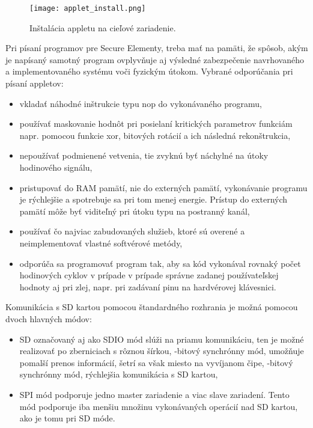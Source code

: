 \documentclass[12pt,a4paper,oneside,openright]{report}
\begin{document}
\begin{figure*}[h]
	\centering
	\texttt{[image: applet\_install.png]}
	\caption{Inštalácia appletu na cieľové zariadenie. \cite{javacardinstruction}}
	\label{f:applet_install}
\end{figure*}


Pri písaní programov pre Secure Elementy, treba mať na pamäti, že spôsob, akým je napísaný samotný program ovplyvňuje aj výsledné zabezpečenie navrhovaného a implementovaného systému voči fyzickým útokom.
Vybrané odporúčania pri písaní appletov:
\begin{itemize}
	\item vkladať náhodné inštrukcie typu nop do vykonávaného programu,
	\item používať maskovanie hodnôt pri posielaní kritických parametrov funkciám napr. pomocou funkcie xor, bitových rotácií a ich následná rekonštrukcia,
	\item nepoužívať podmienené vetvenia, tie zvyknú byť náchylné na útoky hodinového signálu,
	\item pristupovať do RAM pamätí, nie do externých pamätí, vykonávanie programu je rýchlejšie a spotrebuje sa pri tom menej energie. Prístup do externých pamätí môže byť viditeľný pri útoku typu na postranný kanál,
	\item používať čo najviac zabudovaných služieb, ktoré sú overené a neimplementovať vlastné softvérové metódy,
	\item odporúča sa programovať program tak, aby sa kód vykonával rovnaký počet hodinových cyklov v prípade v prípade správne zadanej používateľskej hodnoty aj pri zlej, napr. pri zadávaní pinu na hardvérovej klávesnici.
\end{itemize}
\onehalfspacing

Komunikácia s SD kartou pomocou štandardného rozhrania je možná pomocou dvoch hlavných módov\cite{sdio}:
\singlespacing
\begin{itemize}
	\item SD označovaný aj ako SDIO mód slúži na priamu komunikáciu, ten je možné realizovať po zberniciach s rôznou šírkou,
	-bitový synchrónny mód, umožňuje pomalší prenos informácií, šetrí sa však miesto na vyvíjanom čipe,
	-bitový synchrónny mód, rýchlejšia komunikácia s SD kartou,
	\item SPI mód podporuje jedno master zariadenie a viac slave zariadení. Tento mód podporuje iba menšiu množinu vykonávaných operácií nad SD kartou, ako je tomu pri SD móde.
\end{itemize}
\onehalfspacing
\end{document}
